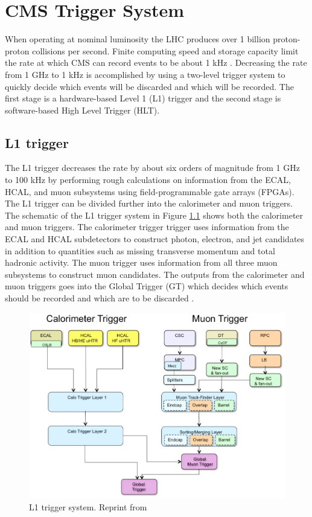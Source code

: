 \chapter{CMS Trigger System}

When operating at nominal luminosity the LHC produces over 1 billion proton-proton collisions per second.  Finite computing speed and storage capacity limit the rate at which CMS can record events to be about 1 kHz \cite{Cadamuro:2017slr}.  Decreasing the rate from 1 GHz to 1 kHz is accomplished by using a two-level trigger system to quickly decide which events will be discarded and which will be recorded. The first stage is a hardware-based Level 1 (L1) trigger and the second stage is software-based High Level Trigger (HLT).  

\section{L1 trigger}
The L1 trigger decreases the rate by about six orders of magnitude from 1 GHz to 100 kHz by performing rough calculations on information from the ECAL, HCAL, and muon subsystems using field-programmable gate arrays (FPGAs).  The L1 trigger can be divided further into the calorimeter and muon triggers.  The schematic of the L1 trigger system in Figure \ref{fig:l1trigger} shows both the calorimeter and muon triggers.  The calorimeter trigger trigger uses information from the ECAL and HCAL subdetectors to construct photon, electron, and jet candidates in addition to quantities such as missing transverse momentum and total hadronic activity.  The muon trigger uses information from all three muon subsystems to construct muon candidates.  The outputs from the calorimeter and muon triggers goes into the Global Trigger (GT) which decides which events should be recorded and which are to be discarded \cite{Wittmann_2016}.

\begin{figure}
	\centering
	\includegraphics[width=1.0\linewidth]{Figures/L1Trigger}
	\caption{L1 trigger system.  Reprint from \cite{L1Triggerfigure:2013yva}}
	\label{fig:l1trigger}
\end{figure}


